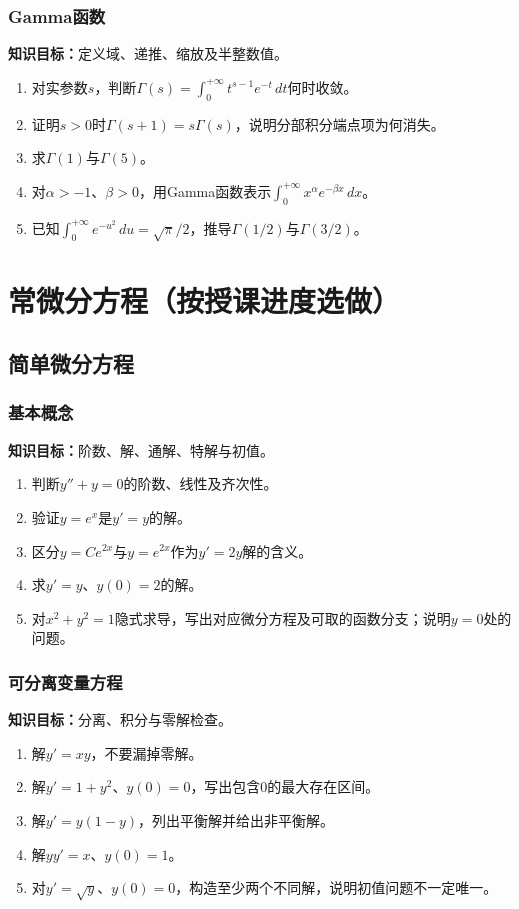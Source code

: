 \documentclass[11pt,a4paper,fontset=fandol]{ctexrep}
\newcommand{\goal}[1]{\textbf{知识目标：}#1\par}
\begin{document}
\subsection{Gamma函数}
\goal{定义域、递推、缩放及半整数值。}
\begin{enumerate}
\item 对实参数$s$，判断$\Gamma(s)=\int_0^{+\infty}t^{s-1}e^{-t}\,dt$何时收敛。
\item 证明$s>0$时$\Gamma(s+1)=s\Gamma(s)$，说明分部积分端点项为何消失。
\item 求$\Gamma(1)$与$\Gamma(5)$。
\item 对$\alpha>-1$、$\beta>0$，用Gamma函数表示$\int_0^{+\infty}x^\alpha e^{-\beta x}\,dx$。
\item 已知$\int_0^{+\infty}e^{-u^2}\,du=\sqrt\pi/2$，推导$\Gamma(1/2)$与$\Gamma(3/2)$。
\end{enumerate}
\chapter{常微分方程（按授课进度选做）}
\section{简单微分方程}
\subsection{基本概念}
\goal{阶数、解、通解、特解与初值。}
\begin{enumerate}
\item 判断$y''+y=0$的阶数、线性及齐次性。
\item 验证$y=e^x$是$y'=y$的解。
\item 区分$y=Ce^{2x}$与$y=e^{2x}$作为$y'=2y$解的含义。
\item 求$y'=y$、$y(0)=2$的解。
\item 对$x^2+y^2=1$隐式求导，写出对应微分方程及可取的函数分支；说明$y=0$处的问题。
\end{enumerate}
\subsection{可分离变量方程}
\goal{分离、积分与零解检查。}
\begin{enumerate}
\item 解$y'=xy$，不要漏掉零解。
\item 解$y'=1+y^2$、$y(0)=0$，写出包含0的最大存在区间。
\item 解$y'=y(1-y)$，列出平衡解并给出非平衡解。
\item 解$yy'=x$、$y(0)=1$。
\item 对$y'=\sqrt y$、$y(0)=0$，构造至少两个不同解，说明初值问题不一定唯一。
\end{enumerate}
\end{document}
